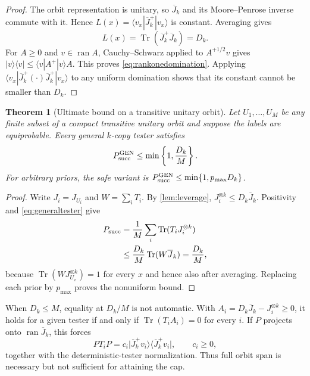 \documentclass[11pt]{article}
\newtheorem{theorem}{Theorem}[section]
\theoremstyle{definition}
\theoremstyle{remark}
\newcommand{\Tr}{\operatorname{Tr}}
\newcommand{\ket}[1]{\lvert #1\rangle}
\newcommand{\bra}[1]{\langle #1\rvert}
\begin{document}
\begin{proof}
The orbit representation is unitary, so $\overline J_k$ and its
Moore--Penrose inverse commute with it.  Hence
$L(x)=\langle v_x|\overline J_k^+|v_x\rangle$ is constant.  Averaging gives
\begin{equation}
 L(x)=\Tr(\overline J_k^+\overline J_k)=D_k.
\end{equation}
For $A\geq0$ and $v\in\operatorname{ran}A$, Cauchy--Schwarz applied to
$A^{+1/2}v$ gives
$\ket v\bra v\leq\langle v|A^+|v\rangle A$.  This proves
\cref{eq:rankonedomination}.  Applying $\langle v_x|\overline J_k^+(\cdot)
\overline J_k^+|v_x\rangle$ to any uniform domination shows that its constant
cannot be smaller than $D_k$.
\end{proof}

\begin{theorem}[Ultimate bound on a transitive unitary orbit]
\label{thm:genbound}
Let $U_1,\ldots,U_M$ be any finite subset of a compact transitive unitary
orbit and suppose the labels are equiprobable.  Every general $k$-copy tester
satisfies
\begin{equation}\label{eq:genbound}
 P_{\rm succ}^{\rm GEN}\leq\min\left\{1,\frac{D_k}{M}\right\}.
\end{equation}
For arbitrary priors, the safe variant is
$P_{\rm succ}^{\rm GEN}\leq\min\{1,p_{\max}D_k\}$.
\end{theorem}

\begin{proof}
Write $J_i=J_{U_i}$ and $W=\sum_iT_i$.  By
\cref{lem:leverage}, $J_i^{\otimes k}\leq D_k\overline J_k$.  Positivity and
\cref{eq:generaltester} give
\begin{align}
 P_{\rm succ}
 &=\frac1M\sum_i\Tr(T_iJ_i^{\otimes k})\\
 &\leq\frac{D_k}{M}\Tr(W\overline J_k)
 =\frac{D_k}{M},
\end{align}
because $\Tr(WJ_{U_x}^{\otimes k})=1$ for every $x$ and hence also after
averaging.  Replacing each prior by $p_{\max}$ proves the nonuniform bound.
\end{proof}

When $D_k\leq M$, equality at $D_k/M$ is not automatic.  With
$A_i=D_k\overline J_k-J_i^{\otimes k}\geq0$, it holds for a given tester if
and only if $\Tr(T_iA_i)=0$ for every $i$.  If $P$ projects onto
$\operatorname{ran}\overline J_k$, this forces
\begin{equation}\label{eq:reciprocaltester}
 PT_iP=c_i\ket{\overline J_k^+v_i}\bra{\overline J_k^+v_i},
 \qquad c_i\geq0,
\end{equation}
together with the deterministic-tester normalization.  Thus full orbit span
is necessary but not sufficient for attaining the cap.
\end{document}
